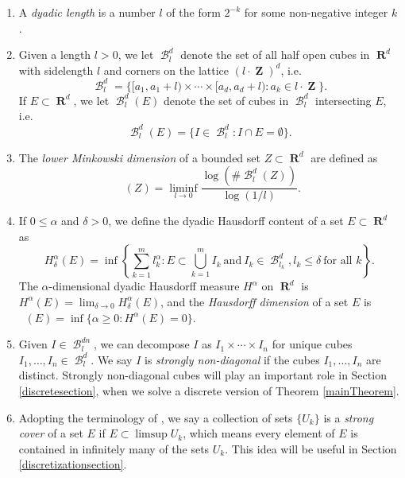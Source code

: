 \documentclass[dvipsnames,letterpaper,12pt]{article}
\numberwithin{equation}{section}
\theoremstyle{plain}
\theoremstyle{remark}
\DeclareMathOperator{\hausdim}{\dim_{\mathbf{H}}}
\DeclareMathOperator{\lowminkdim}{\underline{\dim}_{\mathbf{M}}}
\DeclareMathOperator{\RR}{\mathbf{R}}
\DeclareMathOperator{\ZZ}{\mathbf{Z}}
\DeclareMathOperator{\B}{\mathcal{B}}
\begin{document}
\begin{enumerate}%
	\item\label{defDyadicLength} A {\it dyadic length} is a number $l$ of the form $2^{-k}$ for some non-negative integer $k$.

	\item\label{defDyadicGrid} Given a length $l > 0$, we let $\B^d_l$ denote the set of all half open cubes in $\RR^d$ with sidelength $l$ and corners on the lattice $(l \cdot \ZZ)^d$, i.e.
	\[ \B^d_l = \{ [a_1, a_1 + l) \times \cdots \times [a_d, a_d+l) \colon a_k \in l \cdot \ZZ \}. \]
	If $E \subset \RR^d$, we let $\B^d_l(E)$ denote the set of cubes in $\B^d_l$ intersecting $E$, i.e.
	\[ \B^d_l(E) = \{ I \in \B^d_l \colon I \cap E = \emptyset \}. \]

	\item\label{defnMinkowskiDim} The {\it lower Minkowski dimension} of a bounded set $Z \subset \RR^d$ are defined as
	\[ \lowminkdim(Z) = \liminf_{l \to 0} \frac{\log(\# \B^d_l(Z))}{\log(1/l)}. \]

	\item\label{defHausdorffDim} If $0 \leq \alpha$ and $\delta > 0$, we define the dyadic Hausdorff content of a set $E\subset\RR^d$ as 
	\[ H^\alpha_\delta(E) = \inf \left\{ \sum_{k = 1}^m l_k^\alpha \colon E \subset \bigcup_{k = 1}^m I_k\ \text{and}\ I_k \in \B^d_{l_k}, l_k \leq \delta\ \text{for all $k$} \right\}. \]
	The $\alpha$-dimensional dyadic Hausdorff measure $H^\alpha$ on $\RR^d$ is $H^\alpha(E) = \lim_{\delta \to 0} H_\delta^\alpha(E)$, and the {\it Hausdorff dimension} of a set $E$ is $\hausdim(E) = \inf \{ \alpha \geq 0 \colon H^\alpha(E) = 0 \}$.

	\item\label{defStronglyNonDiagonal} Given $I \in \B^{dn}_l$, we can decompose $I$ as $I_1 \times \cdots \times I_n$ for unique cubes $I_1, \dots, I_n \in \B_l^d$. We say $I$ is {\it strongly non-diagonal} if the cubes $I_1, \dots, I_n$ are distinct. Strongly non-diagonal cubes will play an important role in Section \ref{discretesection}, when we solve a discrete version of Theorem \ref{mainTheorem}.

	\item\label{defStrongCover} Adopting the terminology of \cite{KatzTao}, we say a collection of sets $\{ U_k \}$ is a {\it strong cover} of a set $E$ if $E \subset \limsup U_k$, which means every element of $E$ is contained in infinitely many of the sets $U_k$. This idea will be useful in Section \ref{discretizationsection}.  


\end{enumerate}
\end{document}

